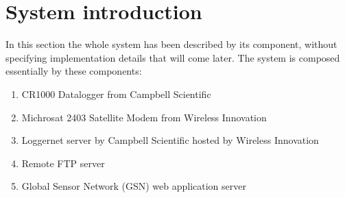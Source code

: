 \section{System introduction}
In this section the whole system has been described by its component, without specifying implementation details that will come later.
The system is composed essentially by these components:
\begin{enumerate}
    \item CR1000 Datalogger from Campbell Scientific
    \item Michrosat 2403 Satellite Modem from Wireless Innovation
    \item Loggernet server by Campbell Scientific hosted by Wireless Innovation
    \item Remote FTP server
    \item Global Sensor Network (GSN) web application server
\end{enumerate}






\clearpage
